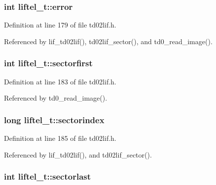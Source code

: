 \subsubsection[{\texorpdfstring{error}{error}}]{\setlength{\rightskip}{0pt plus 5cm}int liftel\+\_\+t\+::error}\hypertarget{structliftel__t_abc69ee3835be72037c41a11b7457cecd}{}\label{structliftel__t_abc69ee3835be72037c41a11b7457cecd}


Definition at line 179 of file td02lif.\+h.



Referenced by lif\+\_\+td02lif(), td02lif\+\_\+sector(), and td0\+\_\+read\+\_\+image().

\subsubsection[{\texorpdfstring{sectorfirst}{sectorfirst}}]{\setlength{\rightskip}{0pt plus 5cm}int liftel\+\_\+t\+::sectorfirst}\hypertarget{structliftel__t_a28dddd09745822ae834b073ad3c3bd98}{}\label{structliftel__t_a28dddd09745822ae834b073ad3c3bd98}


Definition at line 183 of file td02lif.\+h.



Referenced by td0\+\_\+read\+\_\+image().

\subsubsection[{\texorpdfstring{sectorindex}{sectorindex}}]{\setlength{\rightskip}{0pt plus 5cm}long liftel\+\_\+t\+::sectorindex}\hypertarget{structliftel__t_a13e9f8b2e23d8f028f456d4465beb4d5}{}\label{structliftel__t_a13e9f8b2e23d8f028f456d4465beb4d5}


Definition at line 185 of file td02lif.\+h.



Referenced by lif\+\_\+td02lif(), and td02lif\+\_\+sector().

\subsubsection[{\texorpdfstring{sectorlast}{sectorlast}}]{\setlength{\rightskip}{0pt plus 5cm}int liftel\+\_\+t\+::sectorlast}\hypertarget{structliftel__t_aae9fb3e37531df4dfdf0b2906ec95026}{}\label{structliftel__t_aae9fb3e37531df4dfdf0b2906ec95026}


